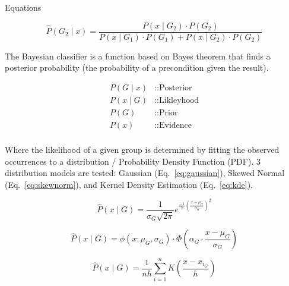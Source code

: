\documentclass[a0paper,portrait]{baposter}
\begin{document}
\begin{poster}
\begin{posterbox}[name=equations,column=0,below=abstract]{Equations}
\begin{small}
\begin{equation}
  \hat{P}(G_2 \mid x) = \frac{P(x \mid G_2) \cdot P(G_2)}{P(x \mid G_1) \cdot P(G_1) + P(x \mid G_2) \cdot P(G_2)}
  \label{eq:classifier}
\end{equation} 

\begin{minipage}[t]{0.575\linewidth}
  \vspace*{0pt}
  \begin{description}
    The Bayesian classifier is a function based on Bayes theorem that finds a posterior probability (the probability of a precondition given the result).
  \end{description}
\end{minipage}
\hfill
\begin{minipage}[t]{0.35\linewidth}
  \vspace*{-10pt}
  \begin{align*}  
  P(G \mid x) & \text{::Posterior}\\
  P(x \mid G) & \text{::Likleyhood}\\
  P(G)        & \text{::Prior}\\
  P(x)        & \text{::Evidence}\\
  \end{align*}
\end{minipage}

\begin{description}
  Where the likelihood of a given group is determined by fitting the observed occurrences to a distribution / Probability Density Function (PDF). 
  3 distribution models are tested:
  Gaussian (Eq.~\ref{eq:gaussian}),  
  Skewed Normal (Eq.~\ref{eq:skewnorm}), and  
  Kernel Density Estimation (Eq.~\ref{eq:kde}).
\end{description}

\begin{equation}
  \hat{P}(x \mid G) =  
  \frac{1}{\sigma_{G} \sqrt{2 \pi}}  
  e^{\tfrac{-1}{2}  
  \left( \tfrac{x-\mu_{G}}{\sigma_{G}}\right)^{2}}  
  \label{eq:gaussian}
\end{equation}

\begin{equation}
  \hat{P}(x \mid G) =  
  \phi\left(x; \mu_G, \sigma_G \right)
  \cdot  
  \Phi\left(  
  \alpha_G \cdot \frac{x - \mu_G}{\sigma_G}  
  \right)
  \label{eq:skewnorm}
\end{equation}

\begin{equation}
  \hat{P}(x \mid G) =  
  \frac{1}{n h} \sum_{i=1}^{n} K\left( \frac{x - x_{i_G}}{h} \right)  
  \label{eq:kde}
\end{equation}


\end{small}
\end{posterbox}
\end{poster}
\end{document}
